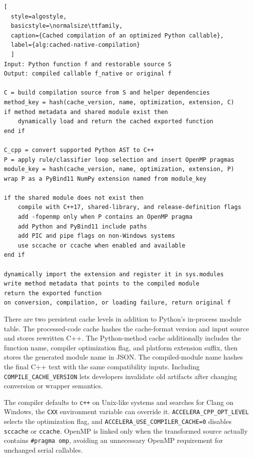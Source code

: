 \newpage
\begin{lstlisting}[
  style=algostyle,
  basicstyle=\normalsize\ttfamily,
  caption={Cached compilation of an optimized Python callable},
  label={alg:cached-native-compilation}
  ]
Input: Python function f and restorable source S
Output: compiled callable f_native or original f

C = build compilation source from S and helper dependencies
method_key = hash(cache_version, name, optimization, extension, C)
if method metadata and shared module exist then
    dynamically load and return the cached exported function
end if

C_cpp = convert supported Python AST to C++
P = apply rule/classifier loop selection and insert OpenMP pragmas
module_key = hash(cache_version, name, optimization, extension, P)
wrap P as a PyBind11 NumPy extension named from module_key

if the shared module does not exist then
    compile with C++17, shared-library, and release-definition flags
    add -fopenmp only when P contains an OpenMP pragma
    add Python and PyBind11 include paths
    add PIC and pipe flags on non-Windows systems
    use sccache or ccache when enabled and available
end if

dynamically import the extension and register it in sys.modules
write method metadata that points to the compiled module
return the exported function
on conversion, compilation, or loading failure, return original f
\end{lstlisting}

There are two persistent cache levels in addition to Python's in-process module
table. The processed-code cache hashes the cache-format version and input source
and stores rewritten C++. The Python-method cache additionally includes the
function name, compiler optimization flag, and platform extension suffix, then
stores the generated module name in JSON. The compiled-module name hashes the
final C++ text with the same compatibility inputs. Including
\texttt{COMPILE\_CACHE\_VERSION} lets developers invalidate old artifacts after
changing conversion or wrapper semantics.

The compiler defaults to \texttt{c++} on Unix-like systems and searches for
Clang on Windows, the \texttt{CXX} environment variable can override it.
\texttt{ACCELERA\_CPP\_OPT\_LEVEL} selects the optimization flag, and
\texttt{ACCELERA\_USE\_COMPILER\_CACHE=0} disables \texttt{sccache} or
\texttt{ccache}. OpenMP is linked only when the transformed source actually
contains \texttt{\#pragma omp}, avoiding an unnecessary OpenMP requirement for
unchanged serial callables.

